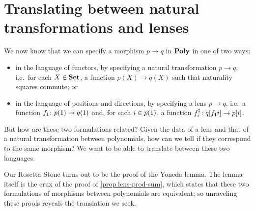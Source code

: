 \documentclass[Book-Poly]{subfiles}
\begin{document}
\section{Translating between natural transformations and lenses} \label{subsec.poly.cat.morph.translate}


We now know that we can specify a morphism $p\to q$ in $\mathbf{Poly}$ in one of two ways:
\begin{itemize}
    \item in the language of functors, by specifying a natural transformation $p \to q$, i.e.\ for each $X\in\mathbf{Set}$, a function $p(X)\to q(X)$ such that naturality squares commute; or
    \item in the language of positions and directions, by specifying a lens $p\to q$, i.e.\ a function $f_{\textsf{1}} \colon p(\textsf{1}) \to q(\textsf{1})$ and, for each $i \in p(\textsf{1})$, a function $f^\sharp_i \colon q[f_{\textsf{1}}i] \to p[i]$.
\end{itemize}
But how are these two formulations related?
Given the data of a lens and that of a natural transformation between polynomials, how can we tell if they correspond to the same morphism?
We want to be able to translate between these two languages.

Our Rosetta Stone turns out to be the proof of the Yoneda lemma.
The lemma itself is the crux of the proof of \cref{prop.lens-prod-sum}, which states that these two formulations of morphisms between polynomials are equivalent; so unraveling these proofs reveals the translation we seek.

\end{document}
